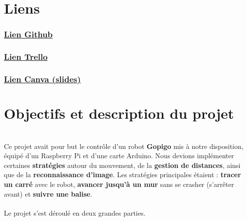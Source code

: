 \documentclass[12pt]{article}
\begin{document}
\section*{Liens}
\begin{center}
  \parbox[p]{0.30\textwidth}{
    \subsubsection*{\href{https://github.com/thibautmarcq/projet-2IN013}{Lien Github}}
  }
  \hfill
  \parbox[p]{0.30\textwidth}{
    \subsubsection*{\href{https://trello.com/b/sourGsMk/projet-robocar-poli}{Lien Trello}}
  }
    \hfill
  \parbox[p]{0.30\textwidth}{
    \subsubsection*{\href{https://www.canva.com/design/DAGG5gl8c54/ctSZ7vz2iyxrhtkZ1uaysg/edit?utm_content=DAGG5gl8c54&utm_campaign=designshare&utm_medium=link2&utm_source=sharebuttonhttps://www.canva.com/design/DAGG5gl8c54/ctSZ7vz2iyxrhtkZ1uaysg/edit?utm_content=DAGG5gl8c54&utm_campaign=designshare&utm_medium=link2&utm_source=sharebutton}{Lien Canva (slides)}}
  }
\end{center}


\newpage
\section*{Objectifs et description du projet}
\\

\hspace{\parindent}Ce projet avait pour but le contrôle d’un robot \textbf{Gopigo} mis à notre disposition, équipé d’un Raspberry Pi et d’une carte Arduino. Nous devions implémenter certaines \textbf{stratégies} autour du mouvement, de la \textbf{gestion de distances}, ainsi que de la \textbf{reconnaissance d’image}. Les stratégies principales étaient : \textbf{tracer un carré} avec le robot, \textbf{avancer jusqu’à un mur} sans se crasher (s’arrêter avant) et \textbf{suivre une balise}.
\\ \\
\hspace{\parindent}Le projet s’est déroulé en deux grandes parties.
\end{document}
